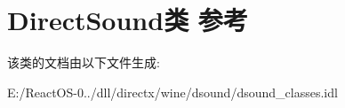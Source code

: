 \hypertarget{class_direct_sound}{}\section{Direct\+Sound类 参考}
\label{class_direct_sound}


该类的文档由以下文件生成\+:\begin{DoxyCompactItemize}
\item 
E\+:/\+React\+O\+S-\/0../dll/directx/wine/dsound/dsound\+\_\+classes.\+idl\end{DoxyCompactItemize}
